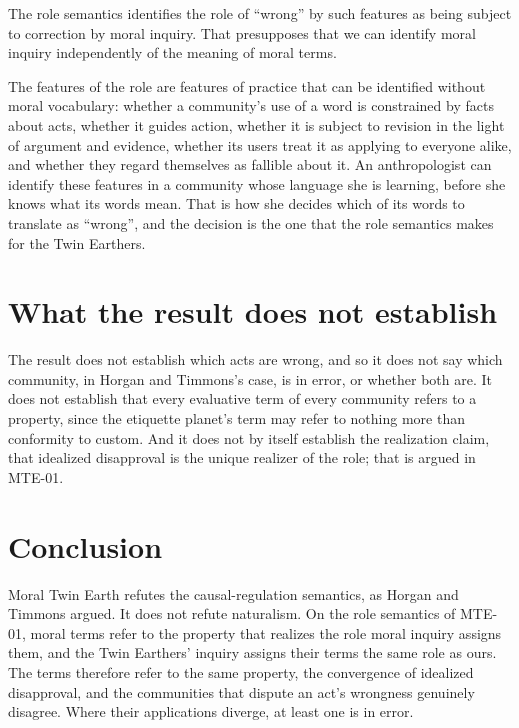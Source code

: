\documentclass{situationist-preprint}
\begin{document}
\begin{objection}
The role semantics identifies the role of \enquote{wrong} by such features as being subject to correction by moral inquiry. That presupposes that we can identify moral inquiry independently of the meaning of moral terms.
\end{objection}

\begin{reply}
The features of the role are features of practice that can be identified without moral vocabulary: whether a community's use of a word is constrained by facts about acts, whether it guides action, whether it is subject to revision in the light of argument and evidence, whether its users treat it as applying to everyone alike, and whether they regard themselves as fallible about it. An anthropologist can identify these features in a community whose language she is learning, before she knows what its words mean. That is how she decides which of its words to translate as \enquote{wrong}, and the decision is the one that the role semantics makes for the Twin Earthers.
\end{reply}

\section{What the result does not establish}

The result does not establish which acts are wrong, and so it does not say which community, in Horgan and Timmons's case, is in error, or whether both are. It does not establish that every evaluative term of every community refers to a property, since the etiquette planet's term may refer to nothing more than conformity to custom. And it does not by itself establish the realization claim, that idealized disapproval is the unique realizer of the role; that is argued in MTE-01.

\section{Conclusion}

Moral Twin Earth refutes the causal-regulation semantics, as Horgan and Timmons argued. It does not refute naturalism. On the role semantics of MTE-01, moral terms refer to the property that realizes the role moral inquiry assigns them, and the Twin Earthers' inquiry assigns their terms the same role as ours. The terms therefore refer to the same property, the convergence of idealized disapproval, and the communities that dispute an act's wrongness genuinely disagree. Where their applications diverge, at least one is in error.
\end{document}
